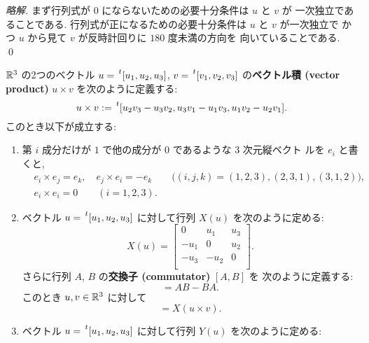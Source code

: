 \documentclass[12pt,twoside]{jarticle}
\newcommand\commentout[1]{#1}
\newcommand\commentout[1]{}
\begin{document}
\commentout{
\begin{proof}[略解]
  まず行列式が $0$ にならないための必要十分条件は $u$ と $v$ が
  一次独立であることである.
  行列式が正になるための必要十分条件は $u$ と $v$ が一次独立で
  かつ  $u$ から見て $v$ が反時計回りに $180$ 度未満の方向を
  向いていることである.
  \qed
\end{proof}
}


\begin{question}[ベクトル積の定義]
  \label{q:def-vp}
  ${\mathbb R}^3$ の2つのベクトル $u=\tp{[u_1,u_2,u_3]}$, $v=\tp{[v_1,v_2,v_3]}$ 
  の{\bf ベクトル積 (vector product)} $u\times v$ を次のように定義する:
  \begin{equation*}
    u\times v :=
    \tp{[
      u_2 v_3 - u_3 v_2,
      u_3 v_1 - u_1 v_3,
      u_1 v_2 - u_2 v_1
    ]}.
  \end{equation*}
  このとき以下が成立する:
  \begin{enumerate}
  \item 第 $i$ 成分だけが $1$ で他の成分が $0$ であるような $3$ 次元縦ベクト
  ルを $e_i$ と書くと,
  \begin{align*}
    &
    e_i \times e_j = e_k, \quad  e_j \times e_i = -e_k
    \qquad \bigl((i,j,k)=(1,2,3),(2,3,1),(3,1,2)\bigr),
    \\ &
    e_i\times e_i = 0 \qquad (i=1,2,3).
  \end{align*}
  \item ベクトル $u=\tp{[u_1,u_2,u_3]}$ に対して行列 $X(u)$ を次のように定める:
    \begin{equation*}
      X(u) =
      \begin{bmatrix}
         0   &  u_1 & u_3 \\
        -u_1 &  0   & u_2 \\
        -u_3 & -u_2 & 0   \\
      \end{bmatrix}.
    \end{equation*}
    さらに行列 $A$, $B$ の{\bf 交換子 (commutator)} $[A,B]$ を
    次のように定義する:
    \begin{equation*}
      [A,B] = AB - BA.
    \end{equation*}
    このとき $u,v\in{\mathbb R}^3$ に対して
    \begin{equation*}
      [X(u), X(v)] = X(u\times v).
    \end{equation*}
  \item ベクトル $u=\tp{[u_1,u_2,u_3]}$ に対して行列 $Y(u)$ を次のように定める:

\end{enumerate}
\end{question}
\end{document}
